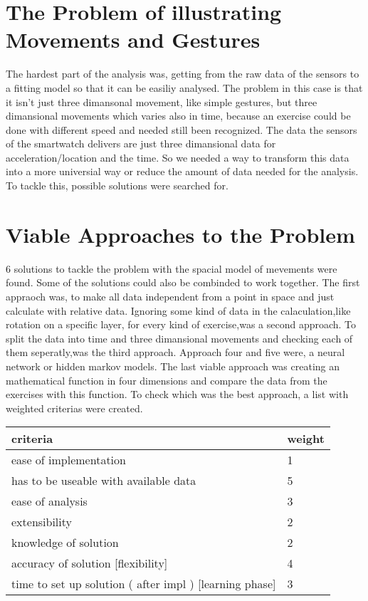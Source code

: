 
\section{The Problem of illustrating Movements and Gestures}

The hardest part of the analysis was, getting from the raw data of the sensors to a fitting model so that it can be easiliy analysed. The problem in this case is that it isn't just three dimansonal movement, like simple gestures, but three dimansional movements which varies also in time, because an exercise could be done with different speed and needed still been recognized. The data the sensors of the smartwatch delivers are just three dimansional data for acceleration/location and the time. So we needed a way to transform this data into a more universial way or reduce the amount of data needed for the analysis. To tackle this, possible solutions were searched for.

\section{Viable Approaches to the Problem}

6 solutions to tackle the problem with the spacial model of mevements were found. Some of the solutions could also be combinded to work together. The first appraoch was, to make all data independent from a point in space and just calculate with relative data. Ignoring some kind of data in the calaculation,like rotation on a specific layer, for every kind of exercise,was a second approach. To split the data into time and three dimansional movements and checking each of them seperatly,was the third approach. Approach four and five were, a neural network or hidden markov models. The last viable approach was creating an mathematical function in four dimensions and compare the data from the exercises with this function.
\newline
\newline 
To check which was the best approach, a list with weighted criterias were created.

\begin{table}[h]
\begin{tabular}{|l|l|}
\hline
	\textbf{criteria} & \textbf{weight} \\
\hline
	ease of implementation & 1\\
\hline
	has to be useable with available data & 5\\
\hline
	ease of analysis & 3\\
\hline
	extensibility & 2\\
\hline
	knowledge of solution & 2\\
\hline
	accuracy of solution [flexibility] & 4\\
\hline
	time to set up solution ( after impl ) 
[learning phase] & 3\\
\hline

\end{tabular}

\end{table}

